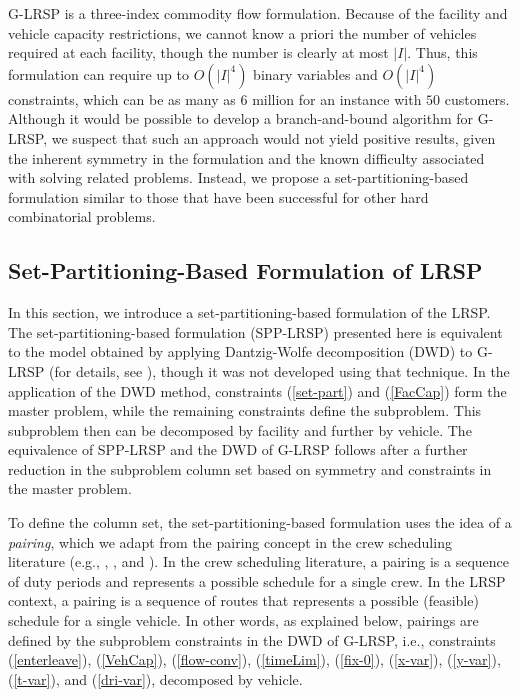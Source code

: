 \documentclass[11pt]{article}
\newcommand{\zelihaupdate}[1]{\noindent \textcolor{blue}{\bf ZE -- UPDATE: #1 } }
\begin{document}
G-LRSP is a three-index commodity flow formulation.
Because of the facility and vehicle capacity restrictions, we cannot
know a priori the number of vehicles required at each facility, though the
number is clearly at most $|I|$.  Thus, this formulation can require
up to $O(|I|^4)$ binary variables 
and $O(|I|^4)$ constraints, which can be as many as 6 million for an 
instance with $50$ customers. 
Although it would be possible to develop 
a branch-and-bound algorithm for G-LRSP, %
we suspect
that such an approach would not yield positive results, given the inherent
symmetry in the formulation and the known difficulty 
associated with solving related problems.
Instead, we propose a set-partitioning-based formulation 
similar to those that have been successful for other hard combinatorial problems.


\subsection{Set-Partitioning-Based Formulation of LRSP}
\label{sec:set-part-form}
In this section, we introduce a set-partitioning-based formulation of 
the LRSP. The set-partitioning-based formulation (SPP-LRSP) presented here is 
equivalent to the model obtained by applying Dantzig-Wolfe decomposition (DWD)
to G-LRSP (for details, see \cite{Akca}), though it was not developed 
using that technique.  
In the application of the DWD  method, constraints (\ref{set-part})
and (\ref{FacCap}) form the master problem, while the remaining constraints 
define the subproblem. This subproblem then can be decomposed by facility
and further by vehicle. 
The equivalence of SPP-LRSP and the DWD of G-LRSP follows after a further
reduction in the subproblem column set based on symmetry and 
constraints in the master problem.

To define the column set, the set-partitioning-based formulation uses the idea of a 
{\em pairing}, which we adapt from the pairing concept in the crew scheduling literature 
(e.g., \citet{Desrosiers}, \citet{Vance}, and \citet{Anbil}). In the 
crew scheduling literature, a pairing is a sequence of duty periods 
and represents  a possible schedule for a single crew. In the LRSP context, 
a pairing is a sequence of routes that represents a possible (feasible) schedule for a 
single vehicle. In other words, as explained below, pairings are defined by the subproblem constraints
in the DWD of G-LRSP, i.e., constraints  (\ref{enterleave}), (\ref{VehCap}),
(\ref{flow-conv}), (\ref{timeLim}), (\ref{fix-0}), (\ref{x-var}), (\ref{y-var}), (\ref{t-var}), 
and (\ref{dri-var}), decomposed by vehicle. 
\end{document}
